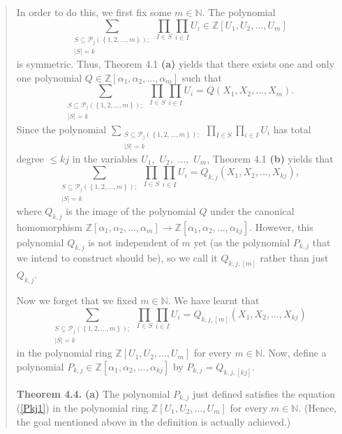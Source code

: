 \documentclass[numbers=enddot,12pt,final,onecolumn,notitlepage]{scrartcl}%
\begin{document}
\begin{quote}
In order to do this, we first fix some $m\in\mathbb{N}$. The polynomial%
\[
\sum_{\substack{S\subseteq\mathcal{P}_{j}\left(  \left\{  1,2,...,m\right\}
\right)  ;\\\left\vert S\right\vert =k}}\prod_{I\in S}\prod_{i\in I}U_{i}%
\in\mathbb{Z}\left[  U_{1},U_{2},...,U_{m}\right]
\]
is symmetric. Thus, Theorem 4.1 \textbf{(a)} yields that there exists one and
only one polynomial $Q\in\mathbb{Z}\left[  \alpha_{1},\alpha_{2}%
,...,\alpha_{m}\right]  $ such that%
\[
\sum_{\substack{S\subseteq\mathcal{P}_{j}\left(  \left\{  1,2,...,m\right\}
\right)  ;\\\left\vert S\right\vert =k}}\prod_{I\in S}\prod_{i\in I}%
U_{i}=Q\left(  X_{1},X_{2},...,X_{m}\right)  .
\]
Since the polynomial $\sum\limits_{\substack{S\subseteq\mathcal{P}_{j}\left(
\left\{  1,2,...,m\right\}  \right)  ;\\\left\vert S\right\vert =k}%
}\prod\limits_{I\in S}\prod\limits_{i\in I}U_{i}$ has total degree $\leq kj$
in the variables $U_{1},$ $U_{2},$ $...,$ $U_{m}$, Theorem 4.1 \textbf{(b)}
yields that%
\[
\sum_{\substack{S\subseteq\mathcal{P}_{j}\left(  \left\{  1,2,...,m\right\}
\right)  ;\\\left\vert S\right\vert =k}}\prod_{I\in S}\prod_{i\in I}%
U_{i}=Q_{k,j}\left(  X_{1},X_{2},...,X_{kj}\right)  ,
\]
where $Q_{k,j}$ is the image of the polynomial $Q$ under the canonical
homomorphism $\mathbb{Z}\left[  \alpha_{1},\alpha_{2},...,\alpha_{m}\right]
\rightarrow\mathbb{Z}\left[  \alpha_{1},\alpha_{2},...,\alpha_{kj}\right]  $.
However, this polynomial $Q_{k,j}$ is not independent of $m$ yet (as the
polynomial $P_{k,j}$ that we intend to construct should be), so we call it
$Q_{k,j,\left[  m\right]  }$ rather than just $Q_{k,j}$.

Now we forget that we fixed $m\in\mathbb{N}$. We have learnt that%
\[
\sum_{\substack{S\subseteq\mathcal{P}_{j}\left(  \left\{  1,2,...,m\right\}
\right)  ;\\\left\vert S\right\vert =k}}\prod_{I\in S}\prod_{i\in I}%
U_{i}=Q_{k,j,\left[  m\right]  }\left(  X_{1},X_{2},...,X_{kj}\right)
\]
in the polynomial ring $\mathbb{Z}\left[  U_{1},U_{2},...,U_{m}\right]  $ for
every $m\in\mathbb{N}$. Now, define a polynomial $P_{k,j}\in\mathbb{Z}\left[
\alpha_{1},\alpha_{2},...,\alpha_{kj}\right]  $ by $P_{k,j}=Q_{k,j,\left[
kj\right]  }.$

\textbf{Theorem 4.4.} \textbf{(a)} The polynomial $P_{k,j}$ just defined
satisfies the equation (\ref{Pkj1}) in the polynomial ring $\mathbb{Z}\left[
U_{1},U_{2},...,U_{m}\right]  $ for every $m\in\mathbb{N}$. (Hence, the goal
mentioned above in the definition is actually achieved.)


\end{quote}
\end{document}
